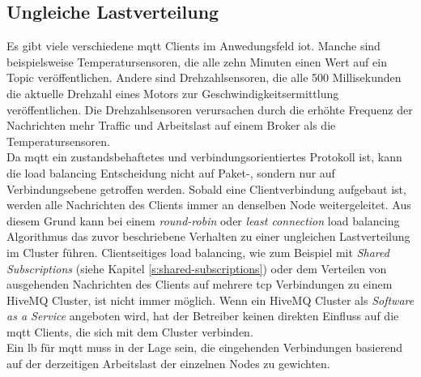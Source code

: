 \subsection{Ungleiche Lastverteilung} \label{sp:load}
Es gibt viele verschiedene \ac{mqtt} Clients im Anwedungsfeld \ac{iot}.
Manche sind beispielsweise Temperatursensoren, die alle zehn Minuten einen Wert auf ein Topic veröffentlichen.
Andere sind Drehzahlsensoren, die alle 500 Millisekunden die aktuelle Drehzahl eines Motors zur Geschwindigkeitsermittlung veröffentlichen.
Die Drehzahlsensoren verursachen durch die erhöhte Frequenz der Nachrichten mehr Traffic und Arbeitslast auf einem Broker als die Temperatursensoren.
\\
Da \ac{mqtt} ein zustandsbehaftetes und verbindungsorientiertes Protokoll ist, kann die load balancing Entscheidung nicht auf Paket-, sondern nur auf Verbindungsebene getroffen werden. Sobald eine Clientverbindung aufgebaut ist, werden alle Nachrichten des Clients immer an denselben Node weitergeleitet.
Aus diesem Grund kann bei einem \textit{round-robin} oder \textit{least connection} load balancing Algorithmus das zuvor beschriebene Verhalten zu einer ungleichen Lastverteilung im Cluster führen.
Clientseitiges load balancing, wie zum Beispiel mit \textit{Shared Subscriptions} (siehe Kapitel \ref{s:shared-subscriptions}) oder dem Verteilen von ausgehenden Nachrichten des Clients auf mehrere \ac{tcp} Verbindungen zu einem HiveMQ Cluster, ist nicht immer möglich. Wenn ein HiveMQ Cluster als \textit{Software as a Service} angeboten wird, hat der Betreiber keinen direkten Einfluss auf die \ac{mqtt} Clients, die sich mit dem Cluster verbinden.
\\
Ein \ac{lb} für \ac{mqtt} muss in der Lage sein, die eingehenden Verbindungen basierend auf der derzeitigen Arbeitslast der einzelnen Nodes zu gewichten.

\newpage
